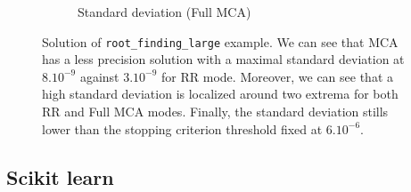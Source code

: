 \documentclass[11pt]{article}
\begin{document}
\begin{figure}
\begin{subfigure}{0.45\linewidth}
    \caption{Standard deviation (Full MCA)}
    \label{fig:stdev_mca}
    \end{subfigure}
    \caption{Solution of \texttt{root\_finding\_large} example. 
    We can see that MCA has a less precision solution with a maximal standard deviation at $8.10^{-9}$ against $3.10^{-9}$ for RR mode. Moreover, we can see that a high standard deviation is localized around two extrema for both RR and Full MCA modes. Finally, the standard deviation stills lower than
    the stopping criterion threshold fixed at $6.10^{-6}$. }
    \label{fig:root_finding_large}
\end{figure}



\subsection{Scikit learn}
\label{sec:sklearn_tests}
\end{document}
